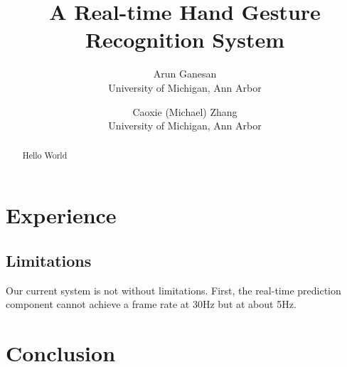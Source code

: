 \documentclass[letterpaper,twocolumn,10pt]{article}
\begin{document}
\date{}

\title{\Large \bf A Real-time Hand Gesture Recognition System}

\author{
{\rm Arun Ganesan}\\
University of Michigan, Ann Arbor
\and
{\rm Caoxie (Michael) Zhang}\\
University of Michigan, Ann Arbor
} %

\maketitle

\thispagestyle{empty}

\begin{abstract}
Hello World
\end{abstract}

















\section{Experience}
\subsection{Limitations}
Our current system is not without limitations. First, the real-time prediction component cannot achieve a frame rate at 30Hz but at about 5Hz.


\section{Conclusion}
\end{document}

